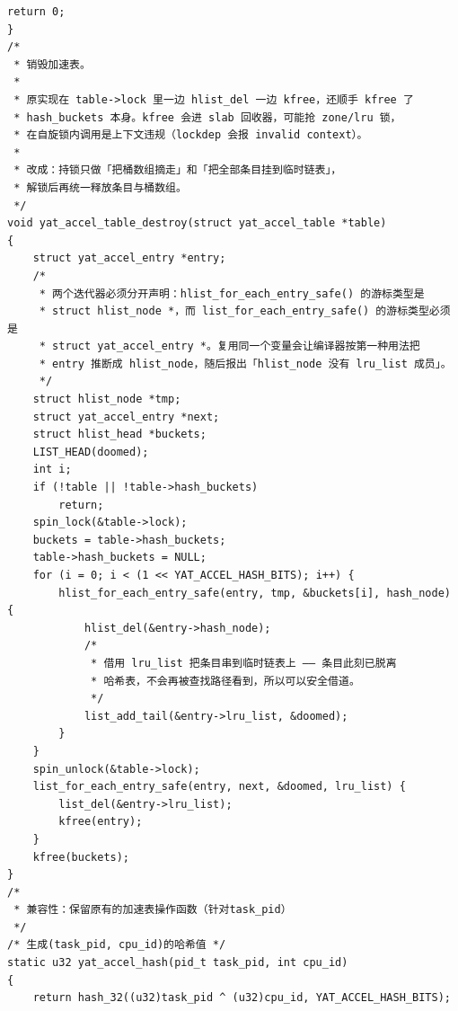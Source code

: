 \documentclass[10pt,a4paper]{article}
\newenvironment{yatpage}{\vspace*{0pt}}{\par}
\begin{document}
\begin{yatpage}
\begin{Verbatim}[fontsize=\fontsize{8.2}{9.8}\selectfont]
    return 0;
}
/*
 * 销毁加速表。
 *
 * 原实现在 table->lock 里一边 hlist_del 一边 kfree，还顺手 kfree 了
 * hash_buckets 本身。kfree 会进 slab 回收器，可能抢 zone/lru 锁，
 * 在自旋锁内调用是上下文违规（lockdep 会报 invalid context）。
 *
 * 改成：持锁只做「把桶数组摘走」和「把全部条目挂到临时链表」，
 * 解锁后再统一释放条目与桶数组。
 */
void yat_accel_table_destroy(struct yat_accel_table *table)
{
    struct yat_accel_entry *entry;
    /*
     * 两个迭代器必须分开声明：hlist_for_each_entry_safe() 的游标类型是
     * struct hlist_node *，而 list_for_each_entry_safe() 的游标类型必须是
     * struct yat_accel_entry *。复用同一个变量会让编译器按第一种用法把
     * entry 推断成 hlist_node，随后报出「hlist_node 没有 lru_list 成员」。
     */
    struct hlist_node *tmp;
    struct yat_accel_entry *next;
    struct hlist_head *buckets;
    LIST_HEAD(doomed);
    int i;
    if (!table || !table->hash_buckets)
        return;
    spin_lock(&table->lock);
    buckets = table->hash_buckets;
    table->hash_buckets = NULL;
    for (i = 0; i < (1 << YAT_ACCEL_HASH_BITS); i++) {
        hlist_for_each_entry_safe(entry, tmp, &buckets[i], hash_node) {
            hlist_del(&entry->hash_node);
            /*
             * 借用 lru_list 把条目串到临时链表上 —— 条目此刻已脱离
             * 哈希表，不会再被查找路径看到，所以可以安全借道。
             */
            list_add_tail(&entry->lru_list, &doomed);
        }
    }
    spin_unlock(&table->lock);
    list_for_each_entry_safe(entry, next, &doomed, lru_list) {
        list_del(&entry->lru_list);
        kfree(entry);
    }
    kfree(buckets);
}
/*
 * 兼容性：保留原有的加速表操作函数（针对task_pid）
 */
/* 生成(task_pid, cpu_id)的哈希值 */
static u32 yat_accel_hash(pid_t task_pid, int cpu_id)
{
    return hash_32((u32)task_pid ^ (u32)cpu_id, YAT_ACCEL_HASH_BITS);
\end{Verbatim}
\end{yatpage}
\newpage
\end{document}
